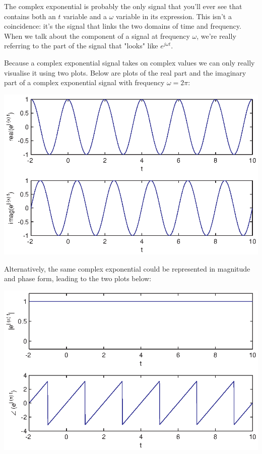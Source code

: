 \documentclass[10pt]{beamer}
\begin{document}
The complex exponential is probably the only signal that you'll ever see that contains both an $t$ variable and a $\omega$ variable in its expression.  This isn't a coincidence:  it's the signal that links the two domains of time and frequency.  When we talk about the component of a signal at frequency $\omega$, we're really referring to the part of the signal that "looks" like $e^{j \omega t}$.

Because a complex exponential signal takes on complex values we can only really visualise it using two plots.  Below are plots of the real part and the imaginary part of a complex exponential signal with frequency $\omega = 2 \pi$:
\begin{center}
  \includegraphics{complexexpplot} 
\end{center}
Alternatively, the same complex exponential could be represented in magnitude and phase form, leading to the two plots below:
\begin{center}
  \includegraphics{complexexpplot2} 
\end{center}
\end{document}
